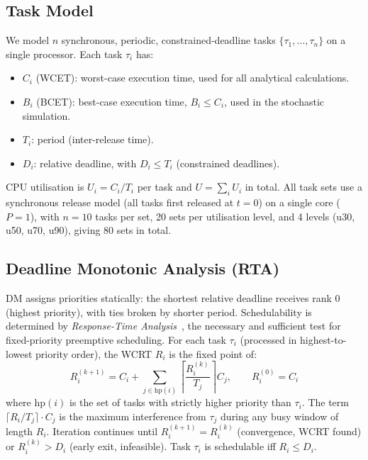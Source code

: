 \documentclass[a4paper,11pt]{article}
\begin{document}
\subsection{Task Model}

We model $n$ synchronous, periodic, constrained-deadline tasks
$\{\tau_1, \ldots, \tau_n\}$ on a single processor. Each task $\tau_i$ has:
\begin{itemize}
    \item $C_i$ (WCET): worst-case execution time, used for all analytical calculations.
    \item $B_i$ (BCET): best-case execution time, $B_i \leq C_i$, used in the stochastic simulation.
    \item $T_i$: period (inter-release time).
    \item $D_i$: relative deadline, with $D_i \leq T_i$ (constrained deadlines).
\end{itemize}
CPU utilisation is $U_i = C_i / T_i$ per task and $U = \sum_{i} U_i$ in total. All task sets use
a synchronous release model (all tasks first released at $t = 0$) on a single core ($P = 1$),
with $n = 10$ tasks per set, 20 sets per utilisation level, and 4 levels (u30, u50, u70, u90),
giving 80 sets in total.

\subsection{Deadline Monotonic Analysis (RTA)}
\label{sec:dm}

DM assigns priorities statically: the shortest relative deadline receives rank 0 (highest
priority), with ties broken by shorter period. Schedulability is determined by
\emph{Response-Time Analysis}~\cite{buttazzo2024}, the necessary and sufficient test for
fixed-priority preemptive scheduling. For each task $\tau_i$ (processed in
highest-to-lowest priority order), the WCRT $R_i$ is the fixed point of:
\begin{equation}
    R_i^{(k+1)} = C_i + \sum_{j \in \mathrm{hp}(i)} \left\lceil \frac{R_i^{(k)}}{T_j}
    \right\rceil C_j, \qquad R_i^{(0)} = C_i
    \label{eq:rta}
\end{equation}
where $\mathrm{hp}(i)$ is the set of tasks with strictly higher priority than $\tau_i$.
The term $\lceil R_i/T_j \rceil \cdot C_j$ is the maximum interference from $\tau_j$
during any busy window of length $R_i$. Iteration continues until $R_i^{(k+1)} = R_i^{(k)}$
(convergence, WCRT found) or $R_i^{(k)} > D_i$ (early exit, infeasible). Task $\tau_i$
is schedulable iff $R_i \leq D_i$.
\end{document}
